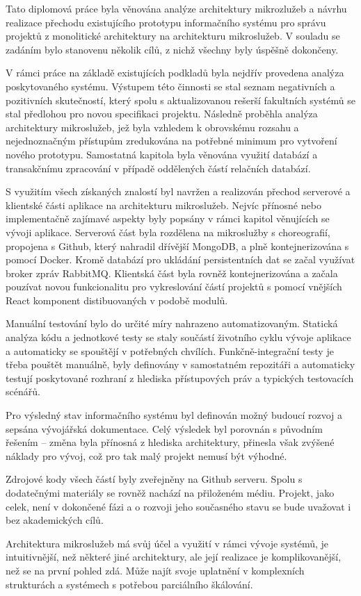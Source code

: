 Tato diplomová práce byla věnována analýze architektury mikrozlužeb a návrhu realizace přechodu existujícího prototypu informačního systému pro správu projektů z monolitické architektury na architekturu mikroslužeb.
V souladu se zadáním bylo stanovenu několik cílů, z nichž všechny byly úspěšně dokončeny.

V rámci práce na základě existujících podkladů byla nejdřív provedena analýza poskytovaného systému.
Výstupem této činnosti se stal seznam negativních a pozitivních skutečností, který spolu s aktualizovanou rešerší fakultních systémů se stal předlohou pro novou specifikaci projektu.
Následně proběhla analýza architektury mikroslužeb, jež byla vzhledem k obrovskému rozsahu a nejednoznačným přístupům zredukována na potřebné minimum pro vytvoření nového prototypu.
Samostatná kapitola byla věnována využití databází a transakčnímu zpracování v případě oddělených částí relačních databází.

S využitím všech získaných znalostí byl navržen a realizován přechod serverové a klientské části aplikace na architekturu mikroslužeb.
Nejvíc přínosné nebo implementačně zajímavé aspekty byly popsány v rámci kapitol věnujících se vývoji aplikace.
Serverová část byla rozdělena na mikroslužby s choreografií, propojena s Github, který nahradil dřívější MongoDB, a plně kontejnerizována s pomocí Docker.
Kromě databází pro ukládání persistentních dat se začal využívat broker zpráv RabbitMQ\@.
Klientská část byla rovněž kontejnerizována a začala pouzívat novou funkcionalitu pro vykreslování částí projektů s pomocí vnějších React komponent distibuovaných v podobě  modulů.

Manuální testování bylo do určité míry nahrazeno automatizovaným.
Statická analýza kódu a jednotkové testy se staly součástí životního cyklu vývoje aplikace a automaticky se spouštějí v potřebných chvílích.
Funkčně-integrační testy je třeba pouštět manuálně, byly definovány v samostatném repozitáři a automaticky testují poskytované rozhraní z hlediska přístupových práv a typických testovacích scénářů.

Pro výsledný stav informačního systému byl definován možný budoucí rozvoj a sepsána vývojářská dokumentace.
Celý výsledek byl porovnán s původním řešením – změna byla přínosná z hlediska architektury, přinesla však zvýšené náklady pro vývoj, což pro tak malý projekt nemusí být výhodné.

Zdrojové kody všech částí  byly zveřejněny na Github serveru.
Spolu s dodatečnými materiály se rovněž nachází na přiloženém médiu.
Projekt, jako celek, není v dokončené fázi a o rozvoji jeho současného stavu se bude uvažovat i bez akademických cílů.

Architektura mikroslužeb má svůj účel a využití v rámci vývoje systémů, je intuitivnější, než některé jiné architektury, ale její realizace je komplikovanější, než se na první pohled zdá.
Může najít svoje uplatnění v komplexních strukturách a systémech s potřebou parciálního škálování.
